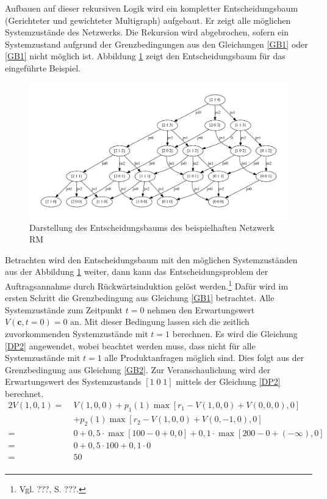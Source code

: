 Aufbauen auf dieser rekursiven Logik wird ein kompletter Entscheidungsbaum (Gerichteter und gewichteter Multigraph) aufgebaut. Er zeigt alle möglichen Systemzustände des Netzwerks. Die Rekursion wird abgebrochen, sofern ein Systemzustand aufgrund der Grenzbedingungen aus den Gleichungen \eqref{GB1} oder \eqref{GB1} nicht möglich ist. Abbildung \ref{B1} zeigt den Entscheidungsbaum für das eingeführte Beispiel.
\begin{figure}[h!]
  \begin{center}
    \includegraphics[width=150mm]{Bilder/Beispiel1.pdf}
    \caption{Darstellung des Entscheidungsbaums des beispielhaften Netzwerk RM}  \label{B1}
  \end{center}
\end{figure}

Betrachten wird den Entscheidungsbaum mit den möglichen Systemzuständen aus der Abbildung \ref{B1} weiter, dann kann das Entscheidungsproblem der Auftragsannahme durch Rückwärtsinduktion gelöst werden.\footnote{Vgl. ???, S. ???.} Dafür wird im ersten Schritt die Grenzbedingung aus Gleichung \eqref{GB1} betrachtet. Alle Systemzustände zum Zeitpunkt $t=0$ nehmen den Erwartungswert $V(\textbf{c}, t=0)=0$ an. Mit dieser Bedingung lassen sich die zeitlich zuvorkommenden Systemzustände mit $t=1$ berechnen. Es wird die Gleichung \eqref{DP2} angewendet, wobei beachtet werden muss, dass nicht für alle Systemzustände mit $t=1$ alle Produktanfragen möglich sind. Dies folgt aus der Grenzbedingung aus Gleichung \eqref{GB2}. Zur Veranschaulichung wird der Erwartungswert des Systemzustands $[1\;0\;1]$ mittels der Gleichung \eqref{DP2} berechnet.
\begin{alignat*}{2}
V(1,0,1)=\;&V(1,0,0)+p_{1}(1)\max[r_{1}-V(1,0,0)+V(0,0,0),0]\\
&+p_{2}(1)\max[r_{2}-V(1,0,0)+V(0,-1,0),0]\\
=\;&0+0,5\cdot\max[100-0+0,0]+0,1\cdot\max[200-0+(-\infty),0]\\
=\;&0+0,5\cdot 100+0,1\cdot0\\
=\;&50\\
\end{alignat*}

